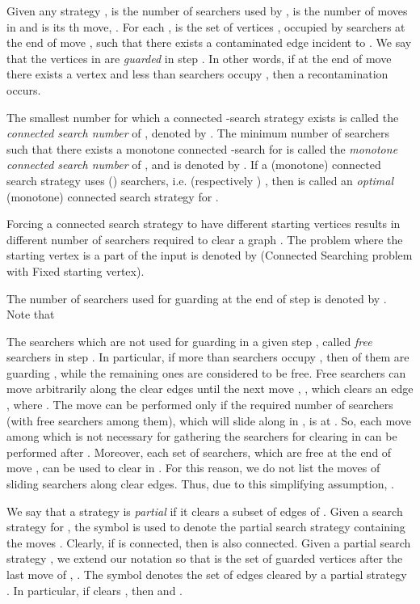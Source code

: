 \documentclass[10pt]{article}
\begin{document}
Given any strategy ,  is the number of searchers used by ,  is the number of moves in  and  is its th move, . For each ,  is the set of vertices , occupied by searchers at the end of move , such that there exists a contaminated edge incident to . We say that the vertices in  are \emph{guarded} in step . In other words, if at the end of move  there exists a vertex  and less than  searchers occupy , then a recontamination occurs.

The smallest number  for which a connected -search strategy  exists is called the \emph{connected search number} of , denoted by . The minimum number of  searchers such that there exists a monotone connected -search for  is called the \emph{monotone connected search number} of , and is denoted by . If a (monotone) connected search strategy  uses ()  searchers, i.e. (respectively ) , then  is called an \emph{optimal} (monotone) connected search strategy for .

Forcing a connected search strategy to have different starting vertices results in different number of searchers required to clear a graph . The problem where the starting vertex is a part of the input is denoted by  (Connected Searching problem with Fixed starting vertex).

The number of searchers used for guarding at the end of step  is denoted by . Note that

The searchers which are not used for guarding in a given step , called \emph{free} searchers in step . In particular, if more than  searchers occupy , then  of them are guarding , while the remaining ones are considered to be free. Free searchers can move arbitrarily along the clear edges until the next move , , which clears an edge , where . The move  can be performed only if the required number of  searchers (with  free searchers among them), which will slide along  in , is at . So, each move among  which is not necessary for gathering the  searchers for clearing  in  can be performed after . Moreover, each set of  searchers, which are free at the end of move , can be used to clear  in . For this reason, we do not list the moves of sliding searchers along clear edges. Thus, due to this simplifying assumption, .

We say that a strategy is \emph{partial} if it clears a subset of edges of . Given a search strategy  for , the symbol  is used to denote the partial search strategy containing the moves . Clearly, if  is connected, then  is also connected. Given a partial search strategy , we extend our notation so that  is the set of guarded vertices after the last move of , . The symbol  denotes the set of edges cleared by a partial strategy . In particular, if  clears , then  and .
\end{document}
